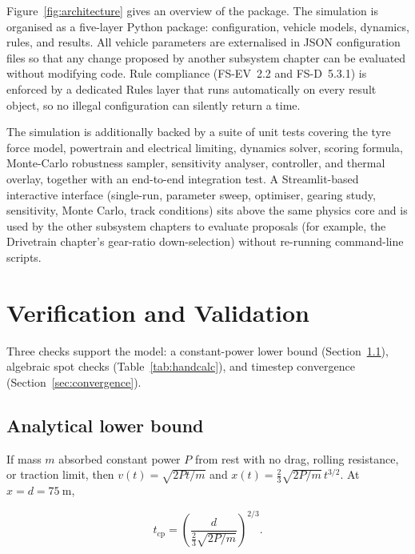 Figure~\ref{fig:architecture} gives an overview of the package.
The simulation is organised as a five-layer Python package:
configuration, vehicle models, dynamics, rules, and results. All
vehicle parameters are externalised in JSON configuration files so
that any change proposed by another subsystem chapter can be
evaluated without modifying code. Rule compliance (FS-EV~2.2 and
FS-D~5.3.1) is enforced by a dedicated Rules layer that runs
automatically on every result object, so no illegal configuration
can silently return a time.

The simulation is additionally backed by a suite of unit tests
covering the tyre force model, powertrain and electrical limiting,
dynamics solver, scoring formula, Monte-Carlo robustness sampler,
sensitivity analyser, controller, and thermal overlay, together with
an end-to-end integration test. A Streamlit-based interactive
interface (single-run, parameter sweep, optimiser, gearing study,
sensitivity, Monte Carlo, track conditions) sits above the same
physics core and is used by the other subsystem chapters to evaluate
proposals (for example, the Drivetrain chapter's gear-ratio down-selection)
without re-running command-line scripts.

\section{Verification and Validation}
\label{sec:vv}

Three checks support the model: a constant-power lower bound
(Section~\ref{sec:analytical_bound}), algebraic spot checks
(Table~\ref{tab:handcalc}), and timestep convergence
(Section~\ref{sec:convergence}).

\subsection{Analytical lower bound}
\label{sec:analytical_bound}

If mass $m$ absorbed constant power $P$ from rest with no drag,
rolling resistance, or traction limit, then
$v(t) = \sqrt{2Pt/m}$ and
$x(t) = \tfrac{2}{3}\sqrt{2P/m}\,t^{3/2}$. At $x=d=\SI{75}{\metre}$,

\begin{equation}
t_\text{cp} = \left(\frac{d}{\tfrac{2}{3}\sqrt{2P/m}}\right)^{2/3}.
\label{eq:analytical_bound}
\end{equation}

